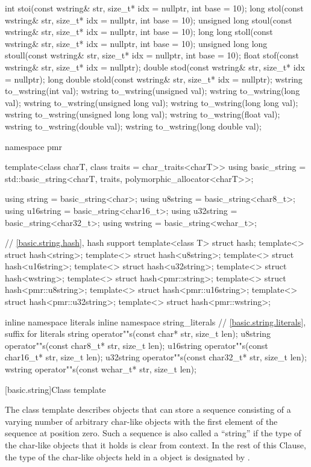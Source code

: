 \begin{codeblock}
{  int stoi(const wstring& str, size_t* idx = nullptr, int base = 10);
  long stol(const wstring& str, size_t* idx = nullptr, int base = 10);
  unsigned long stoul(const wstring& str, size_t* idx = nullptr, int base = 10);
  long long stoll(const wstring& str, size_t* idx = nullptr, int base = 10);
  unsigned long long stoull(const wstring& str, size_t* idx = nullptr, int base = 10);
  float stof(const wstring& str, size_t* idx = nullptr);
  double stod(const wstring& str, size_t* idx = nullptr);
  long double stold(const wstring& str, size_t* idx = nullptr);
  wstring to_wstring(int val);
  wstring to_wstring(unsigned val);
  wstring to_wstring(long val);
  wstring to_wstring(unsigned long val);
  wstring to_wstring(long long val);
  wstring to_wstring(unsigned long long val);
  wstring to_wstring(float val);
  wstring to_wstring(double val);
  wstring to_wstring(long double val);

  namespace pmr {
    template<class charT, class traits = char_traits<charT>>
      using basic_string = std::basic_string<charT, traits, polymorphic_allocator<charT>>;

    using string    = basic_string<char>;
    using u8string  = basic_string<char8_t>;
    using u16string = basic_string<char16_t>;
    using u32string = basic_string<char32_t>;
    using wstring   = basic_string<wchar_t>;
  }

  // \ref{basic.string.hash}, hash support
  template<class T> struct hash;
  template<> struct hash<string>;
  template<> struct hash<u8string>;
  template<> struct hash<u16string>;
  template<> struct hash<u32string>;
  template<> struct hash<wstring>;
  template<> struct hash<pmr::string>;
  template<> struct hash<pmr::u8string>;
  template<> struct hash<pmr::u16string>;
  template<> struct hash<pmr::u32string>;
  template<> struct hash<pmr::wstring>;

  inline namespace literals {
  inline namespace string_literals {
    // \ref{basic.string.literals}, suffix for  literals
    string    operator""s(const char* str, size_t len);
    u8string  operator""s(const char8_t* str, size_t len);
    u16string operator""s(const char16_t* str, size_t len);
    u32string operator""s(const char32_t* str, size_t len);
    wstring   operator""s(const wchar_t* str, size_t len);
  }
  }
}
\end{codeblock}

[basic.string]{Class template }

\pnum
{}%
The
class template
describes objects that can store a sequence consisting of a varying number of
arbitrary char-like objects with the first element of the sequence at position zero.
Such a sequence is also called a ``string'' if the type of the
char-like objects that it holds
is clear from context.
In the rest of this Clause,
the type of the char-like objects held in a  object
is designated by .

